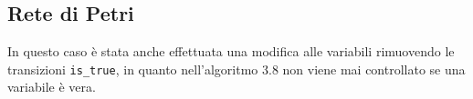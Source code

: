 \documentclass[a4paper]{article}
\begin{document}
\subsection{Rete di Petri}
In questo caso è stata anche effettuata una modifica alle variabili rimuovendo le transizioni \texttt{is\_true}, in quanto nell'algoritmo 3.8 non viene mai controllato se una variabile è vera.
\newpage
\begin{center}
\end{center}
\end{document}
